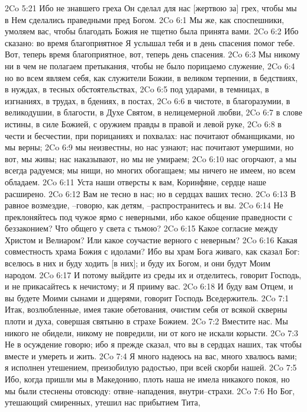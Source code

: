 2Co 5:21  Ибо не знавшего греха Он сделал для нас [жертвою за] грех, чтобы мы в Нем сделались праведными пред Богом.
2Co 6:1  Мы же, как споспешники, умоляем вас, чтобы благодать Божия не тщетно была принята вами.
2Co 6:2  Ибо сказано: во время благоприятное Я услышал тебя и в день спасения помог тебе. Вот, теперь время благоприятное, вот, теперь день спасения.
2Co 6:3  Мы никому ни в чем не полагаем претыкания, чтобы не было порицаемо служение,
2Co 6:4  но во всем являем себя, как служители Божии, в великом терпении, в бедствиях, в нуждах, в тесных обстоятельствах,
2Co 6:5  под ударами, в темницах, в изгнаниях, в трудах, в бдениях, в постах,
2Co 6:6  в чистоте, в благоразумии, в великодушии, в благости, в Духе Святом, в нелицемерной любви,
2Co 6:7  в слове истины, в силе Божией, с оружием правды в правой и левой руке,
2Co 6:8  в чести и бесчестии, при порицаниях и похвалах: нас почитают обманщиками, но мы верны;
2Co 6:9  мы неизвестны, но нас узнают; нас почитают умершими, но вот, мы живы; нас наказывают, но мы не умираем;
2Co 6:10  нас огорчают, а мы всегда радуемся; мы нищи, но многих обогащаем; мы ничего не имеем, но всем обладаем.
2Co 6:11  Уста наши отверсты к вам, Коринфяне, сердце наше расширено.
2Co 6:12  Вам не тесно в нас; но в сердцах ваших тесно.
2Co 6:13  В равное возмездие, --говорю, как детям, --распространитесь и вы.
2Co 6:14  Не преклоняйтесь под чужое ярмо с неверными, ибо какое общение праведности с беззаконием? Что общего у света с тьмою?
2Co 6:15  Какое согласие между Христом и Велиаром? Или какое соучастие верного с неверным?
2Co 6:16  Какая совместность храма Божия с идолами? Ибо вы храм Бога живаго, как сказал Бог: вселюсь в них и буду ходить [в них]; и буду их Богом, и они будут Моим народом.
2Co 6:17  И потому выйдите из среды их и отделитесь, говорит Господь, и не прикасайтесь к нечистому; и Я прииму вас.
2Co 6:18  И буду вам Отцем, и вы будете Моими сынами и дщерями, говорит Господь Вседержитель.
2Co 7:1  Итак, возлюбленные, имея такие обетования, очистим себя от всякой скверны плоти и духа, совершая святыню в страхе Божием.
2Co 7:2  Вместите нас. Мы никого не обидели, никому не повредили, ни от кого не искали корысти.
2Co 7:3  Не в осуждение говорю; ибо я прежде сказал, что вы в сердцах наших, так чтобы вместе и умереть и жить.
2Co 7:4  Я много надеюсь на вас, много хвалюсь вами; я исполнен утешением, преизобилую радостью, при всей скорби нашей.
2Co 7:5  Ибо, когда пришли мы в Македонию, плоть наша не имела никакого покоя, но мы были стеснены отовсюду: отвне--нападения, внутри--страхи.
2Co 7:6  Но Бог, утешающий смиренных, утешил нас прибытием Тита,
